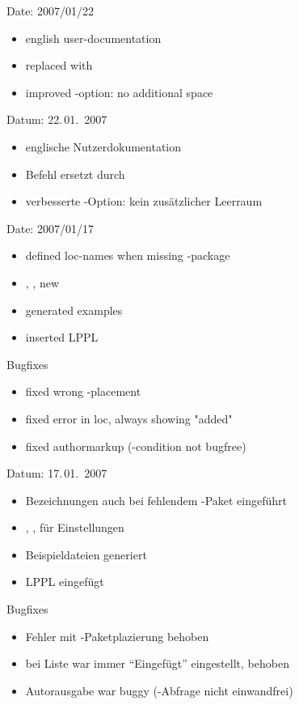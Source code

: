 
\ifENGLISH
Date: 2007/01/22
\begin{itemize}
\item english user-documentation
\item replaced  with 
\item improved -option: no additional space
\end{itemize}
\fi
\ifGERMAN
	Datum: 22.\,01.~2007
	\begin{itemize}
	\item englische Nutzerdokumentation
	\item Befehl  ersetzt durch 
	\item verbesserte -Option: kein zusätzlicher Leerraum
	\end{itemize}
\fi


\ifENGLISH
Date: 2007/01/17
\begin{itemize}
\item defined loc-names when missing -package
\item {}, ,  new
\item generated examples
\item inserted LPPL
\end{itemize}
Bugfixes
\begin{itemize}
\item fixed wrong -placement
\item fixed error in loc, always showing "added"
\item fixed authormarkup (-condition not bugfree)
\end{itemize}
\fi
\ifGERMAN
	Datum: 17.\,01.~2007
	\begin{itemize}
	\item Bezeichnungen auch bei fehlendem -Paket eingeführt
	\item {}, ,  für Einstellungen
	\item Beispieldateien generiert
	\item LPPL eingefügt
	\end{itemize}
	Bugfixes
	\begin{itemize}
	\item Fehler mit -Paketplazierung behoben
	\item bei Liste war immer "`Eingefügt"' eingestellt, behoben
	\item Autorausgabe war buggy (-Abfrage nicht einwandfrei)
	\end{itemize}
\fi

